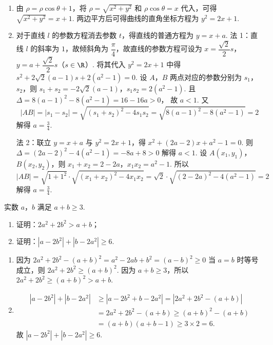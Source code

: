\begin{solution}
\begin{enumerate}
\item 由 \( \rho=\rho\cos\theta+1 \)，将 \( \rho=\sqrt{x^2+y^2} \) 和 \( \rho\cos\theta=x \) 代入，可得
\(\sqrt{x^2+y^2}=x+1\).
两边平方后可得曲线的直角坐标方程为
\(y^2=2x+1\).

\item 对于直线 \( l \) 的参数方程消去参数 \( t \)，得直线的普通方程为
\(y=x+a\).
法 1：直线 \( l \) 的斜率为 \( 1 \)，故倾斜角为 \( \dfrac{\pi}{4} \)，故直线的参数方程可设为 \( x=\dfrac{\sqrt{2}}{2}s \)，\( y=a+\dfrac{\sqrt{2}}{2}s \)（\( s\in \R \)）.
将其代入 \( y^2=2x+1 \) 中得
\(s^2+2\sqrt{2}(a-1)s+2(a^2-1)=0\).
设 \(A\)，\(B\) 两点对应的参数分别为 \(s_1\)，\(s_2\)，则
\(s_1+s_2=-2\sqrt{2}(a-1)\)，\(s_1s_2=2(a^2-1)\).
且
\(\Delta=8(a-1)^2-8(a^2-1)=16-16a>0\)，
故 \( a<1 \).
又
\[
|AB|=|s_1-s_2|=\sqrt{(s_1+s_2)^2-4s_1s_2}=\sqrt{8(a-1)^2-8(a^2-1)}=2
\]
解得 \( a=\frac{3}{4} \).

法 2：联立 \( y=x+a \) 与 \( y^2=2x+1 \)，得
\(x^2+(2a-2)x+a^2-1=0\).
则
\(\Delta=(2a-2)^2-4(a^2-1)=-8a+8>0\)
解得 \( a<1 \). 设 \( A(x_1,y_1) \)，\( B(x_2,y_2) \)，则
\(x_1+x_2=2-2a\)，\(x_1x_2=a^2-1\).
所以
\[
|AB|=\sqrt{1+1^2}\cdot \sqrt{(x_1+x_2)^2-4x_1x_2}=\sqrt{2}\cdot \sqrt{(2-2a)^2-4(a^2-1)}=2
\]
解得 \( a=\frac{3}{4} \).
\end{enumerate}
\end{solution}

\begin{problem}
实数 \(a\)，\(b\) 满足 \( a+b\ge 3 \).

\begin{enumerate}
\item 证明：\( 2a^2+2b^2>a+b \)；
\item 证明：\( |a-2b^2|+|b-2a^2|\ge 6 \).
\end{enumerate}
\end{problem}

\begin{solution}
\begin{enumerate}
\item 因为
\(2a^2+2b^2-(a+b)^2=a^2-2ab+b^2=(a-b)^2\ge 0\)
当 \( a=b \) 时等号成立，则
\(2a^2+2b^2\ge (a+b)^2\).
因为 \( a+b\ge 3 \)，所以
\(2a^2+2b^2\ge (a+b)^2>a+b\).

\item
\[
\begin{aligned}
|a-2b^2|+|b-2a^2|
&\ge |a-2b^2+b-2a^2|=|2a^2+2b^2-(a+b)|\\
&=2a^2+2b^2-(a+b)\ge (a+b)^2-(a+b)\\
&=(a+b)(a+b-1)\ge 3\times 2=6.
\end{aligned}
\]
故
\(|a-2b^2|+|b-2a^2|\ge 6\).
\end{enumerate}
\end{solution}

